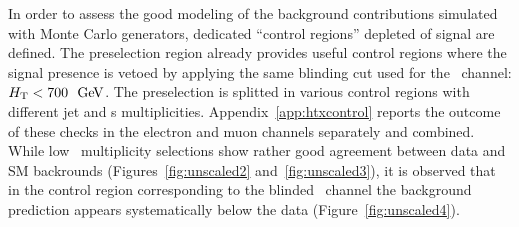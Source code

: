 In order to assess the good modeling of the background contributions
simulated with Monte Carlo generators, dedicated ``control regions''
depleted of signal are defined. The preselection region already provides
useful control regions where the signal presence is vetoed by applying the
same blinding cut used for the \chii\ channel: $\HT < 700~\gev$.
The preselection is splitted in various control regions with different
jet and \bjet s multiplicities. Appendix~\ref{app:htxcontrol} reports
the outcome of these checks in the electron and muon channels separately
and combined. While low \bjet\ multiplicity selections show rather good
agreement between data and SM backrounds (Figures~\ref{fig:unscaled2}
and~\ref{fig:unscaled3}), it is observed that
in the control region corresponding to the blinded \chiv\ channel
the background prediction appears systematically below the data 
(Figure~\ref{fig:unscaled4}).

